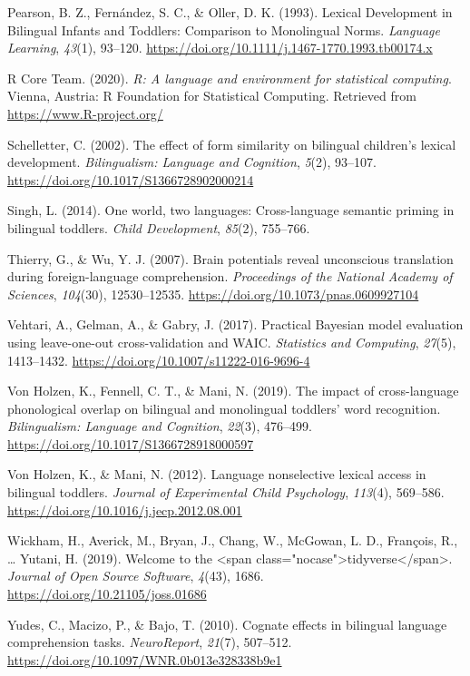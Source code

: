 \documentclass[
  english,
  man,man,floatsintext]{apa6}
\newlength{\cslhangindent}
\newenvironment{cslreferences}%
  {\setlength{\parindent}{0pt}%
  \everypar{\setlength{\hangindent}{\cslhangindent}}\ignorespaces}%
  {\par}
\begin{document}
\begin{cslreferences}
\leavevmode\hypertarget{ref-pearson_lexical_1993}{}%
Pearson, B. Z., Fernández, S. C., \& Oller, D. K. (1993). Lexical Development in Bilingual Infants and Toddlers: Comparison to Monolingual Norms. \emph{Language Learning}, \emph{43}(1), 93--120. \url{https://doi.org/10.1111/j.1467-1770.1993.tb00174.x}

\leavevmode\hypertarget{ref-rcoreteam_r_2020}{}%
R Core Team. (2020). \emph{R: A language and environment for statistical computing}. Vienna, Austria: R Foundation for Statistical Computing. Retrieved from \url{https://www.R-project.org/}

\leavevmode\hypertarget{ref-schelletter_effect_2002}{}%
Schelletter, C. (2002). The effect of form similarity on bilingual children's lexical development. \emph{Bilingualism: Language and Cognition}, \emph{5}(2), 93--107. \url{https://doi.org/10.1017/S1366728902000214}

\leavevmode\hypertarget{ref-singh_one_2014}{}%
Singh, L. (2014). One world, two languages: Cross-language semantic priming in bilingual toddlers. \emph{Child Development}, \emph{85}(2), 755--766.

\leavevmode\hypertarget{ref-thierry_brain_2007}{}%
Thierry, G., \& Wu, Y. J. (2007). Brain potentials reveal unconscious translation during foreign-language comprehension. \emph{Proceedings of the National Academy of Sciences}, \emph{104}(30), 12530--12535. \url{https://doi.org/10.1073/pnas.0609927104}

\leavevmode\hypertarget{ref-vehtari_practical_2017}{}%
Vehtari, A., Gelman, A., \& Gabry, J. (2017). Practical Bayesian model evaluation using leave-one-out cross-validation and WAIC. \emph{Statistics and Computing}, \emph{27}(5), 1413--1432. \url{https://doi.org/10.1007/s11222-016-9696-4}

\leavevmode\hypertarget{ref-von_holzen_impact_2019}{}%
Von Holzen, K., Fennell, C. T., \& Mani, N. (2019). The impact of cross-language phonological overlap on bilingual and monolingual toddlers' word recognition. \emph{Bilingualism: Language and Cognition}, \emph{22}(3), 476--499. \url{https://doi.org/10.1017/S1366728918000597}

\leavevmode\hypertarget{ref-von_holzen_language_2012}{}%
Von Holzen, K., \& Mani, N. (2012). Language nonselective lexical access in bilingual toddlers. \emph{Journal of Experimental Child Psychology}, \emph{113}(4), 569--586. \url{https://doi.org/10.1016/j.jecp.2012.08.001}

\leavevmode\hypertarget{ref-wickham_welcome_2019}{}%
Wickham, H., Averick, M., Bryan, J., Chang, W., McGowan, L. D., François, R., \ldots{} Yutani, H. (2019). Welcome to the \textless span class="nocase"\textgreater tidyverse\textless/span\textgreater. \emph{Journal of Open Source Software}, \emph{4}(43), 1686. \url{https://doi.org/10.21105/joss.01686}

\leavevmode\hypertarget{ref-yudes_cognate_2010}{}%
Yudes, C., Macizo, P., \& Bajo, T. (2010). Cognate effects in bilingual language comprehension tasks. \emph{NeuroReport}, \emph{21}(7), 507--512. \url{https://doi.org/10.1097/WNR.0b013e328338b9e1}
\end{cslreferences}

\endgroup
\end{document}

